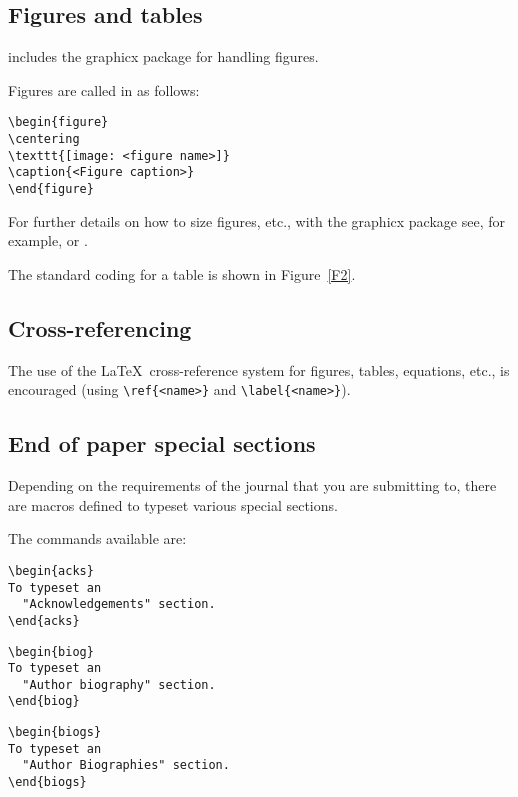 \documentclass[Afour,sageh,times]{sagej}
\begin{document}
\subsection{Figures and tables} \textsf{\journalclass} includes the
\textsf{graphicx} package for handling figures.

Figures are called in as follows:
\begin{verbatim}
\begin{figure}
\centering
\texttt{[image: <figure name>]}
\caption{<Figure caption>}
\end{figure}
\end{verbatim}

For further details on how to size figures, etc., with the
\textsf{graphicx} package see, for example, \cite{R1}
or \cite{R3}.

The standard coding for a table is shown in Figure~\ref{F2}.

\subsection{Cross-referencing}
The use of the \LaTeX\ cross-reference system
for figures, tables, equations, etc., is encouraged
(using \verb"\ref{<name>}" and \verb"\label{<name>}").

\subsection{End of paper special sections}
Depending on the requirements of the journal that you are submitting to,
there are macros defined to typeset various special sections.

The commands available are:
\begin{verbatim}
\begin{acks}
To typeset an
  "Acknowledgements" section.
\end{acks}
\end{verbatim}

\begin{verbatim}
\begin{biog}
To typeset an
  "Author biography" section.
\end{biog}
\end{verbatim}

\begin{verbatim}
\begin{biogs}
To typeset an
  "Author Biographies" section.
\end{biogs}
\end{verbatim}
\end{document}
